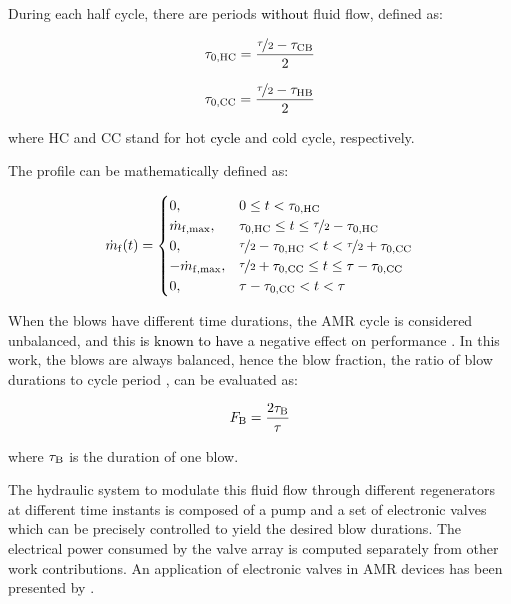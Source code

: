 \documentclass[draft]{svjour3}
\begin{document}
During each half cycle, there are periods \textcolor{black}{without}  fluid flow, defined as:

\begin{equation}
\label{eq:48}
\tau_{\mathrm{0,HC}} = \frac{\nicefrac{\tau}{2} - \tau_{\mathrm{CB}}}{2}
\end{equation}

\begin{equation}
\label{eq:49}
\tau_{\mathrm{0,CC}} = \frac{\nicefrac{\tau}{2} - \tau_{\mathrm{HB}}}{2}
\end{equation}

where HC and CC stand for hot \textcolor{black}{cycle} and cold cycle, respectively.


The profile can be mathematically defined as:

\begin{equation}
\dot{m}_{\mathrm{f}}(t)=
\begin{cases}
0, & 0 \le t < \tau_{\mathrm{0,HC}} \\
\dot{m}_{\mathrm{f,max}}, & \tau_{\mathrm{0,HC}} \le t \le \nicefrac{\tau}{2} - \tau_{\mathrm{0,HC}} \\
0, & \nicefrac{\tau}{2} - \tau_{\mathrm{0,HC}} < t < \nicefrac{\tau}{2} + \tau_{\mathrm{0,CC}} \\
-\dot{m}_{\mathrm{f,max}}, & \nicefrac{\tau}{2} + \tau_{\mathrm{0,CC}} \le t \le \tau - \tau_{\mathrm{0,CC}} \\
0, &  \tau - \tau_{\mathrm{0,CC}} <  t < \tau \\
\end{cases}
\label{eq:50}
\end{equation}

When the blows have different time durations, the AMR cycle is considered unbalanced, and this \textcolor{black}{is known to have} a negative effect on performance \cite{bib:eriksen16_effec,bib:nakashima18-influen-exp}. In this work, the blows are always balanced, hence the blow fraction, the ratio of blow durations to cycle period \cite{bib:nakashima18-influen-exp}, can be evaluated as:

\begin{equation}
\label{eq:59}
F_{\mathrm{B}} = \frac{2\tau_{\mathrm{B}}}{\tau}
\end{equation}

\noindent where $\tau_{\mathrm{B}}$ is the duration of one blow.


The hydraulic system to modulate this fluid flow through different regenerators at different time instants is composed of a pump and a set of electronic valves which can be precisely controlled to yield the desired blow durations. The electrical power consumed by the valve array is computed separately from other work contributions. An application of electronic valves in AMR devices has been presented by \cite{bib:nakashima18-perfor-asses-solen-valves-flow}.
\end{document}
